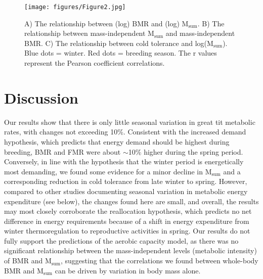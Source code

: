 \documentclass[10pt, twoside]{book} %
\begin{document}
\renewcommand{\thefigure}{4.\arabic{figure}}
	\begin{figure}[h!]
		\begin{center}
\small
			\texttt{[image: figures/Figure2.jpg]}
		\end{center}
		\begin{footnotesize}
			\caption{\footnotesize A) The relationship between (log) BMR and (log) M$_{\text{sum}}$. B) The relationship between mass-independent M$_{\text{sum}}$ and mass-independent BMR. C) The relationship between cold tolerance and log(M$_{\text{sum}}$). Blue dots = winter. Red dots = breeding season. The r values represent the Pearson coefficient correlations.\label{fig4.1}}
		\end{footnotesize}
	\end{figure}
\clearpage

\section{Discussion}
Our results show that there is only little seasonal variation in great tit metabolic rates, with changes not exceeding 10\%. Consistent with the increased demand hypothesis, which predicts that energy demand should be highest during breeding, BMR and FMR were about $\sim$10\% higher during the spring period. Conversely, in line with the hypothesis that the winter period is energetically most demanding, we found some evidence for a minor decline in M$_{\text{sum}}$ and a corresponding reduction in cold tolerance from late winter to spring. However, compared to other studies documenting seasonal variation in metabolic energy expenditure (see below), the changes found here are small, and overall, the results may most closely corroborate the reallocation hypothesis, which predicts no net difference in energy requirements because of a shift in energy expenditure from winter thermoregulation to reproductive activities in spring. Our results do not fully support the predictions of the aerobic capacity model, as there was no significant relationship between the mass-independent levels (metabolic intensity) of BMR and M$_{\text{sum}}$, suggesting that the correlations we found between whole-body BMR and M$_{\text{sum}}$ can be driven by variation in body mass alone.
\end{document}
